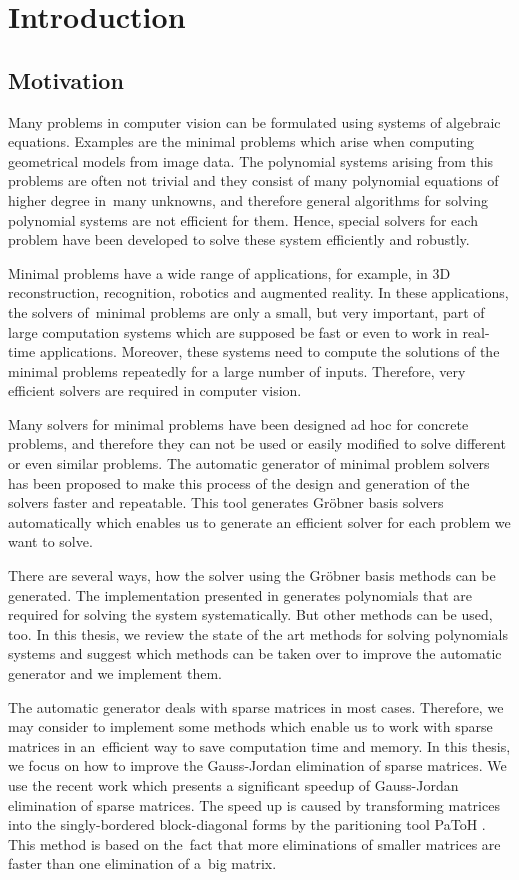 \chapter{Introduction}
\section{Motivation}
Many problems in computer vision can be formulated using systems of algebraic equations. Examples are the minimal problems \cite{MinimalProblems} which arise when computing geometrical models from image data. The polynomial systems arising from this problems are often not trivial and they consist of many polynomial equations of higher degree in~many unknowns, and therefore general algorithms for solving polynomial systems are not efficient for them. Hence, special solvers for each problem have been developed to solve these system efficiently and robustly.

Minimal problems have a wide range of applications, for example, in 3D reconstruction, recognition, robotics and augmented reality. In these applications, the solvers of~minimal problems are only a small, but very important, part of large computation systems which are supposed be fast or even to work in real-time applications. Moreover, these systems need to compute the solutions of the minimal problems repeatedly for a large number of inputs. Therefore, very efficient solvers are required in computer vision.

Many solvers for minimal problems have been designed ad hoc for concrete problems, and therefore they can not be used or easily modified to solve different or even similar problems. The automatic generator \cite{AutoGen} of minimal problem solvers has been proposed to make this process of the design and generation of the solvers faster and repeatable. This tool generates Gr\"obner basis solvers automatically which enables us to generate an efficient solver for each problem we want to solve.

There are several ways, how the solver using the Gr\"obner basis methods can be generated. The implementation presented in \cite{AutoGen} generates polynomials that are required for solving the system systematically. But other methods can be used, too. In this thesis, we review the state of the art methods for solving polynomials systems and suggest which methods can be taken over to improve the automatic generator and we implement them.

The automatic generator deals with sparse matrices in most cases. Therefore, we may consider to implement some methods which enable us to work with sparse matrices in an~efficient way to save computation time and memory. In this thesis, we focus on how to improve the Gauss-Jordan elimination of sparse matrices. We use the recent work \cite{SBBD} which presents a significant speedup of Gauss-Jordan elimination of sparse matrices. The speed up is caused by transforming matrices into the singly-bordered block-diagonal forms by the paritioning tool PaToH \cite{PaToH}. This method is based on the~fact that more eliminations of smaller matrices are faster than one elimination of a~big matrix.

